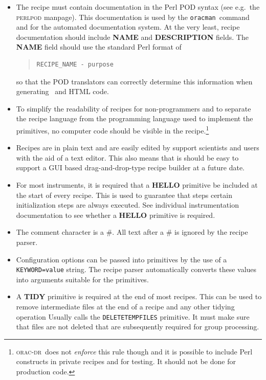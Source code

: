 \documentclass[twoside,11pt]{article}
\newcommand{\latex}[1]{#1}
\renewcommand{\_}{\texttt{\symbol{95}}}
\newcommand{\Oracdr}{\textsc{orac-dr}}
\newcommand{\oracman}{\texttt{oracman}}
\newcommand{\primitive}[1]{{\small\texttt{#1}}}
\newenvironment{myquote}{\begin{quote}\begin{small}}{\end{small}\end{quote}}
\begin{document}
\begin{itemize}
\item The recipe must contain documentation in the Perl POD syntax
(see e.g.\ the \textsc{perlpod} manpage). This documentation is used
by the \oracman\ command and for the automated documentation system.
At the very least, recipe documentation should include \textbf{NAME}
and \textbf{DESCRIPTION} fields. The \textbf{NAME} field should use
the standard Perl format of
\begin{myquote}
\begin{verbatim}
RECIPE_NAME - purpose
\end{verbatim}
\end{myquote}
so that the POD translators can correctly determine this information
when generating \latex\ and HTML code.

\item To simplify the readability of recipes for non-programmers and
to separate the recipe language from the programming language
used to implement the primitives, no computer code should be visible
in the recipe.\footnote{\Oracdr\ does not \emph{enforce} this rule
though and it is possible to include Perl constructs in private
recipes and for testing. It should not be done for production code.}

\item Recipes are in plain text and are easily edited by support
scientists and users with the aid of a text editor. This also means
that is should be easy to support a GUI based drag-and-drop-type
recipe builder at a future date.

\item For most instruments, it is required that a \textbf{HELLO}
primitive be included at the start of every recipe. This is used 
to guarantee that steps certain initialization steps are always
executed. See individual instrumentation documentation to see whether
a \textbf{HELLO} primitive is required.

\item The comment character is a \#. All text after a \# is ignored by 
the recipe parser.

\item Configuration options can be passed into primitives by the use
of a \texttt{KEYWORD=value} string. The recipe parser automatically
converts these values into arguments suitable for the primitives.


\item A \textbf{TIDY} primitive is required at the end of most
recipes. This can be used to remove intermediate files at the
end of a recipe and any other tidying operation Usually calls the
\primitive{\_DELETE\_TEMP\_FILES\_} primitive. It must make sure that
files are not deleted that are subsequently required for group processing.


\end{itemize}
\end{document}
